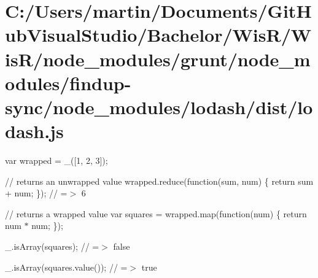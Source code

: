 \hypertarget{_c_1_2_users_2martin_2_documents_2_git_hub_visual_studio_2_bachelor_2_wis_r_2_wis_r_2node_modulec1c1ceea3bc761d16d3a7f2f7b908ed6}{}\section{C\+:/\+Users/martin/\+Documents/\+Git\+Hub\+Visual\+Studio/\+Bachelor/\+Wis\+R/\+Wis\+R/node\+\_\+modules/grunt/node\+\_\+modules/findup-\/sync/node\+\_\+modules/lodash/dist/lodash.\+js}
var wrapped = \+\_\+(\mbox{[}1, 2, 3\mbox{]});

// returns an unwrapped value wrapped.\+reduce(function(sum, num) \{ return sum + num; \}); // =$>$ 6

// returns a wrapped value var squares = wrapped.\+map(function(num) \{ return num $\ast$ num; \});

\+\_\+.\+is\+Array(squares); // =$>$ false

\+\_\+.\+is\+Array(squares.\+value()); // =$>$ true


